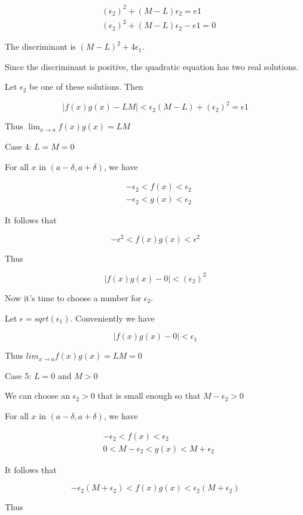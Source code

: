 \begin{align*}
& (\epsilon_2)^2 + (M - L)\epsilon_2 = e1 \\
& (\epsilon_2)^2 + (M - L)\epsilon_2 - e1 = 0 
\end{align*}

The discriminant is $(M - L)^2 + 4\epsilon_1$.

Since the discriminant is positive, the quadratic equation has two real solutions.

Let $\epsilon_2$ be one of these solutions. Then

$$ |f(x)g(x) - LM| < \epsilon_2(M - L) + (\epsilon_2)^2 = \epsilon1 $$

Thus $\lim_{x \rightarrow a} f(x)g(x) = LM$

Case 4: $L = M = 0$

For all $x$ in $(a - \delta, a + \delta)$, we have

\begin{align*}
& -\epsilon_2 < f(x) < \epsilon_2 \\
& -\epsilon_2 < g(x) < \epsilon_2
\end{align*}

It follows that

    $$ -\epsilon^2 < f(x)g(x) < \epsilon^2 $$

Thus

    $$ |f(x)g(x) - 0| < (\epsilon_2)^2 $$

Now it's time to choose a number for $\epsilon_2$.

Let $\epsilon = sqrt(\epsilon_1)$. Conveniently we have

    $$ |f(x)g(x) - 0| < \epsilon_1 $$

Thus $lim_{x \rightarrow a} f(x)g(x) = LM = 0$

Case 5: $L = 0$ and $M > 0$

We can choose an $\epsilon_2 > 0$ that is small enough so that $M - \epsilon_2 > 0$

For all $x$ in $(a - \delta, a + \delta)$, we have

\begin{align*}
& -\epsilon_2 < f(x) < \epsilon_2 \\
& 0 < M - \epsilon_2 < g(x) < M + \epsilon_2
\end{align*}

It follows that

    $$ -\epsilon_2(M + \epsilon_2) < f(x)g(x) < \epsilon_2(M + \epsilon_2) $$

Thus

